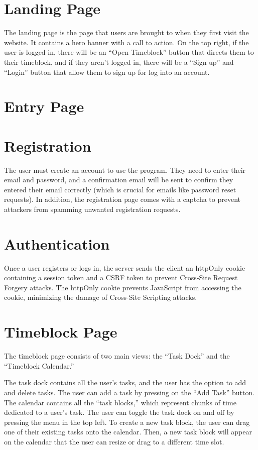 \documentclass[notitlepage, 12pt]{report}
\begin{document}
\section*{Landing Page}
The landing page is the page that users are brought to when they first visit the website. It contains a hero banner with a call to action. On the top right, if the user is logged in, there will be an “Open Timeblock” button that directs them to their timeblock, and if they aren’t logged in, there will be a “Sign up” and “Login” button that allow them to sign up for log into an account.

\section*{Entry Page}

\section*{Registration}
The user must create an account to use the program. They need to enter their email and password, and a confirmation email will be sent to confirm they entered their email correctly (which is crucial for emails like password reset requests). In addition, the registration page comes with a captcha to prevent attackers from spamming unwanted registration requests.

\section*{Authentication}
Once a user registers or logs in, the server sends the client an httpOnly cookie containing a session token and a CSRF token to prevent Cross-Site Request Forgery attacks. The httpOnly cookie prevents JavaScript from accessing the cookie, minimizing the damage of Cross-Site Scripting attacks.

\section*{Timeblock Page}
The timeblock page consists of two main views: the “Task Dock” and the “Timeblock Calendar.”

The task dock contains all the user’s tasks, and the user has the option to add and delete tasks. The user can add a task by pressing on the “Add Task” button. The calendar contains all the “task blocks,” which represent chunks of time dedicated to a user’s task. The user can toggle the task dock on and off by pressing the menu in the top left. To create a new task block, the user can drag one of their existing tasks onto the calendar. Then, a new task block will appear on the calendar that the user can resize or drag to a different time slot.
\end{document}
